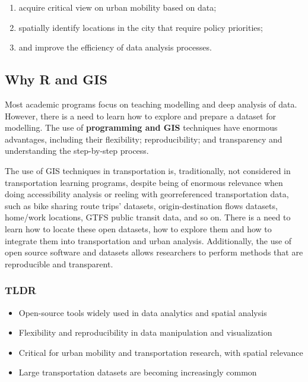 \documentclass[
  letterpaper,
  DIV=11,
  numbers=noendperiod]{scrreprt}
\begin{document}
\begin{enumerate}
\def\labelenumi{\arabic{enumi}.}
\item
  acquire critical view on urban mobility based on data;
\item
  spatially identify locations in the city that require policy
  priorities;
\item
  and improve the efficiency of data analysis processes.
\end{enumerate}

\subsection*{Why R and GIS}\label{why-r-and-gis}

Most academic programs focus on teaching modelling and deep analysis of
data. However, there is a need to learn how to explore and prepare a
dataset for modelling. The use of \textbf{programming and GIS}
techniques have enormous advantages, including their flexibility;
reproducibility; and transparency and understanding the step-by-step
process.

The use of GIS techniques in transportation is, traditionally, not
considered in transportation learning programs, despite being of
enormous relevance when doing accessibility analysis or reeling with
georreferenced transportation data, such as bike sharing route trips'
datasets, origin-destination flows datasets, home/work locations, GTFS
public transit data, and so on. There is a need to learn how to locate
these open datasets, how to explore them and how to integrate them into
transportation and urban analysis. Additionally, the use of open source
software and datasets allows researchers to perform methods that are
reproducible and transparent.

\subsubsection*{TLDR}\label{tldr}

\begin{itemize}
\item
  Open-source tools widely used in data analytics and spatial analysis
\item
  Flexibility and reproducibility in data manipulation and visualization
\item
  Critical for urban mobility and transportation research, with spatial
  relevance
\item
  Large transportation datasets are becoming increasingly common
\end{itemize}
\end{document}
